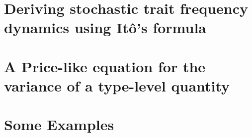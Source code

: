 \documentclass[twoside, 12pt]{iiser-thesis-modified} %
\begin{document}
\chapter{Deriving stochastic trait frequency dynamics using It\^{o}'s formula}\label{App_density_to_freq}

\chapter{A Price-like equation for the variance of a type-level quantity}\label{App_stoch_var_eqns}

\chapter{Some Examples}\label{App_examples}


\cleardoublepage
{}
\printbibliography
{}

\end{document}

